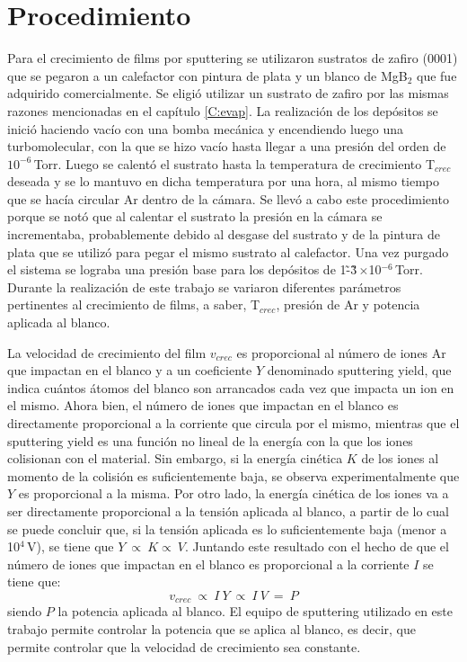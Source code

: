 \section{Procedimiento}\label{S:sputproc}
Para el crecimiento de films por sputtering se utilizaron sustratos de zafiro (0001) que se pegaron a un calefactor con pintura de plata y un blanco de MgB$_2$ que fue adquirido comercialmente. Se eligió utilizar un sustrato de zafiro por las mismas razones mencionadas en el capítulo \ref{C:evap}. La realización de los depósitos se inició haciendo vacío con una bomba mecánica y encendiendo luego una turbomolecular, con la que se hizo vacío hasta llegar a una presión del orden de $10^{-6}$\,Torr. Luego se calentó el sustrato hasta la temperatura de crecimiento T$_{crec}$ deseada y se lo mantuvo en dicha temperatura por una hora, al mismo tiempo que se hacía circular Ar dentro de la cámara. Se llevó a cabo este procedimiento porque se notó que al calentar el sustrato la presión en la cámara se incrementaba, probablemente debido al desgase del sustrato y de la pintura de plata que se utilizó para pegar el mismo sustrato al calefactor. Una vez purgado el sistema se lograba una presión base para los depósitos de 1\~-\~3\,$\times$10$^{-6}$\,Torr. Durante la realización de este trabajo se variaron diferentes parámetros pertinentes al crecimiento de films, a saber, T$_{crec}$, presión de Ar y potencia aplicada al blanco.

La velocidad de crecimiento del film $v_{crec}$ es proporcional al número de iones Ar que impactan en el blanco y a un coeficiente $Y$ denominado sputtering yield, que indica cuántos átomos del blanco son arrancados cada vez que impacta un ion en el mismo. Ahora bien, el número de iones que impactan en el blanco es directamente proporcional a la corriente que circula por el mismo, mientras que el sputtering yield es una función no lineal de la energía con la que los iones colisionan con el material. Sin embargo, si la energía cinética $K$ de los iones al momento de la colisión es suficientemente baja, se observa experimentalmente que $Y$ es proporcional a la misma. Por otro lado, la energía cinética de los iones va a ser directamente proporcional a la tensión aplicada al blanco, a partir de lo cual se puede concluir que, si la tensión aplicada es lo suficientemente baja (menor a 10$^4$\,V), se tiene que $Y \ \varpropto \ K \varpropto \ V$. Juntando este resultado con el hecho de que el número de iones que impactan en el blanco es proporcional a la corriente $I$ se tiene que:
\begin{equation}
v_{crec} \ \varpropto \ I \ Y \ \varpropto \ I \ V \ = \ P
\label{eq:vcrec_2}
\end{equation}
\noindent
siendo $P$ la potencia aplicada al blanco. El equipo de sputtering utilizado en este trabajo permite controlar la potencia que se aplica al blanco, es decir, que permite controlar que la velocidad de crecimiento sea constante.

